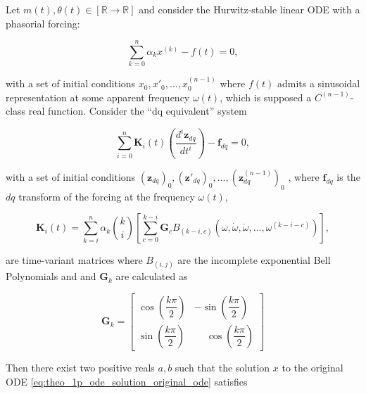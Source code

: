 \begin{theorem} \label{theo:1p_ode_solution}%

	Let $m\left(t\right),\theta\left(t\right)\in\left[\mathbb{R}\to\mathbb{R}\right]$ and consider the Hurwitz-stable linear ODE with a phasorial forcing:

\begin{equation} \sum\limits_{k=0}^{n} \alpha_k x^{\left(k\right)} - f(t) = 0, \label{eq:theo_1p_ode_solution_original_ode}\end{equation}

	\noindent with a set of initial conditions $x_0,x'_0,...,x^{(n-1)}_0$ where $f(t)$ admits a sinusoidal representation at some apparent frequency $\omega(t)$, which is supposed a $C^{\left(n-1\right)}$-class real function. Consider the ``dq equivalent'' system

\begin{equation} \sum\limits_{i=0}^n \mathbf{K}_i(t) \left(\dfrac{d^i \mathbf{z}_{dq}}{dt^i }\right) - \mathbf{f}_{dq} = 0 , \label{eq:theo_1p_ode_solution_dq_equiv}\end{equation}

	\noindent with a set of initial conditions $(\mathbf{z}_{dq})_0,(\mathbf{z}'_{dq})_0,...,(\mathbf{z}^{(n-1)}_{dq})_0$ , where $\mathbf{f}_{dq}$ is the $dq$ transform of the forcing at the frequency $\omega(t)$,

\begin{equation} \mathbf{K}_i(t) = \sum\limits_{k=i}^{n} \alpha_k{k\choose i} \left[\sum\limits_{c=0}^{k-i} \mathbf{G}_c B_{\left(k-i,c\right)}\left(\omega,\dot{\omega},\ddot{\omega},...,\omega^{(k-i-c)}\right) \right] ,\label{eq:ki_transf} \end{equation}

	\noindent are time-variant matrices where $B_{\left(i,j\right)}$ are the incomplete exponential Bell Polynomials and and $\mathbf{G}_k$ are calculated as

\begin{equation}
\mathbf{G}_k = 
\left[\begin{array}{ccc}
 \cos\left( \dfrac{k\pi}{2}\right) &  -\sin\left(\dfrac{k\pi}{2}\right) \\[5mm]
 \sin\left( \dfrac{k\pi}{2}\right) & \phantom{-} \cos\left(\dfrac{k\pi}{2}\right)
\end{array}\right]
\end{equation}

	Then there exist two positive reals $a,b$ such that the solution $x$ to the original ODE \eqref{eq:theo_1p_ode_solution_original_ode} satisfies


\end{theorem}
